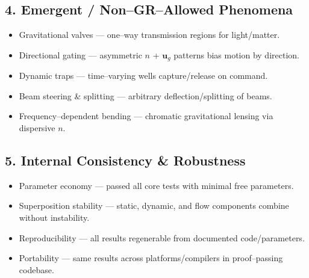 \documentclass{article}
\begin{document}
\subsection*{4. Emergent / Non--GR--Allowed Phenomena}
\begin{itemize}
    \item Gravitational valves --- one--way transmission regions for light/matter.
    \item Directional gating --- asymmetric $n$ + $\mathbf{u}_g$ patterns bias motion by direction.
    \item Dynamic traps --- time--varying wells capture/release on command.
    \item Beam steering \& splitting --- arbitrary deflection/splitting of beams.
    \item Frequency--dependent bending --- chromatic gravitational lensing via dispersive $n$.
\end{itemize}

\subsection*{5. Internal Consistency \& Robustness}
\begin{itemize}
    \item Parameter economy --- passed all core tests with minimal free parameters.
    \item Superposition stability --- static, dynamic, and flow components combine without instability.
    \item Reproducibility --- all results regenerable from documented code/parameters.
    \item Portability --- same results across platforms/compilers in proof--passing codebase.
\end{itemize}
\end{document}
